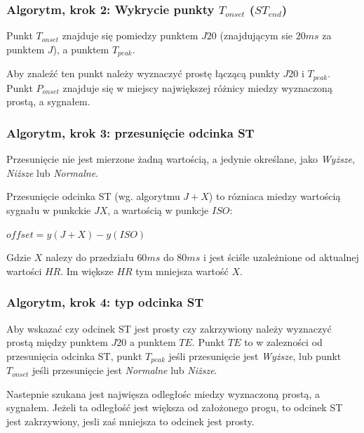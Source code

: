 \documentclass{beamer}
\begin{document}
\begin{frame}
  \frametitle{Algorytm, krok 2: Wykrycie punkty $T_{onset}$ ($ST_{end}$)}

  Punkt $T_{onset}$ znajduje się pomiedzy punktem $J20$ (znajdującym sie $20ms$
  za punktem $J$), a punktem $T_{peak}$.

  Aby znaleźć ten punkt należy wyznaczyć prostę łączącą punkty $J20$ i
  $T_{peak}$. Punkt $P_{onset}$ znajduje się w miejscy największej różnicy
  miedzy wyznaczoną prostą, a sygnałem.

\end{frame}

\begin{frame}
  \frametitle{Algorytm, krok 3: przesunięcie odcinka ST}

  Przesunięcie nie jest mierzone żadną wartością, a jedynie określane, jako
  \emph{Wyższe}, \emph{Niższe} lub \emph{Normalne}.

  Przesunięcie odcinka ST (wg. algorytmu $J+X$) to rózniaca miedzy wartością
  sygnału w punkckie $JX$, a wartością w punkcje $ISO$:

  \begin{center}
  \begin{math}
    offset = y(J+X) - y(ISO)
  \end{math}
  \end{center}

  Gdzie $X$ nalezy do przedziału $60ms$ do $80ms$ i jest ściśle uzależnione 
  od aktualnej wartości $HR$. Im większe $HR$ tym mniejsza wartość $X$.
\end{frame}

\begin{frame}
  \frametitle{Algorytm, krok 4: typ odcinka ST}

  Aby wskazać czy odcinek ST jest prosty czy zakrzywiony należy wyznaczyć
  prostą między punktem $J20$ a punktem $TE$. Punkt $TE$ to w zalezności od
  przesunięcia odcinka ST, punkt $T_{peak}$ jeśli przesunięcie jest
  \emph{Wyższe}, lub punkt $T_{onset}$ jeśli przesunięcie jest \emph{Normalne}
  lub \emph{Niższe}.

  Nastepnie szukana jest najwięsza odległośc miedzy wyznaczoną prostą, a
  sygnałem. Jeżeli ta odległość jest większa od założonego progu, to odcinek ST
  jest zakrzywiony, jesli zaś mniejsza to odcinek jest prosty.
\end{frame}
\end{document}
